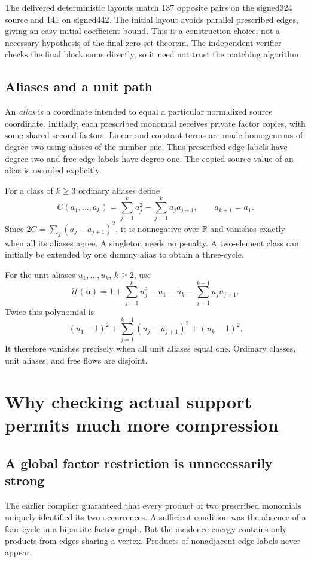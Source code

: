 \documentclass[11pt,letterpaper]{article}
\theoremstyle{definition}\newtheorem{definition}[theorem]{Definition}
\theoremstyle{remark}\newtheorem{remark}[theorem]{Remark}
\newcommand{\Ueq}{\mathcal U}
\begin{document}
The delivered deterministic layouts match 137 opposite pairs on the
signed324 source and 141 on signed442. The initial layout avoids
parallel prescribed edges, giving an easy initial coefficient bound.
This is a construction choice, not a necessary hypothesis of the final
zero-set theorem. The independent verifier checks the final block sums
directly, so it need not trust the matching algorithm.

\subsection{Aliases and a unit path}

An \emph{alias} is a coordinate intended to equal a particular normalized
source coordinate. Initially, each prescribed monomial receives private
factor copies, with some shared second factors. Linear and constant terms
are made homogeneous of degree two using aliases of the number one.
Thus prescribed edge labels have degree two and free edge labels have
degree one. The copied source value of an alias is recorded explicitly.

For a class of \(k\ge3\) ordinary aliases define
\[
 C(a_1,\ldots,a_k)=\sum_{j=1}^k a_j^2
                 -\sum_{j=1}^k a_ja_{j+1},\qquad a_{k+1}=a_1.
\]
Since \(2C=\sum_j(a_j-a_{j+1})^2\), it is nonnegative over \(\mathbb R\)
and vanishes exactly when all its aliases agree. A singleton needs no
penalty. A two-element class can initially be extended by one dummy
alias to obtain a three-cycle.

For the unit aliases \(u_1,\ldots,u_k\), \(k\ge2\), use
\[
 \Ueq(\mathbf u)=1+\sum_{j=1}^k u_j^2-u_1-u_k
                    -\sum_{j=1}^{k-1}u_ju_{j+1}.
\]
Twice this polynomial is
\[
 (u_1-1)^2+\sum_{j=1}^{k-1}(u_j-u_{j+1})^2+(u_k-1)^2.
\]
It therefore vanishes precisely when all unit aliases equal one.
Ordinary classes, unit aliases, and free flows are disjoint.

\section{Why checking actual support permits much more compression}

\subsection{A global factor restriction is unnecessarily strong}

The earlier compiler guaranteed that every product of two prescribed
monomials uniquely identified its two occurrences. A sufficient condition
was the absence of a four-cycle in a bipartite factor graph. But the
incidence energy contains only products from edges sharing a vertex.
Products of nonadjacent edge labels never appear.
\end{document}
